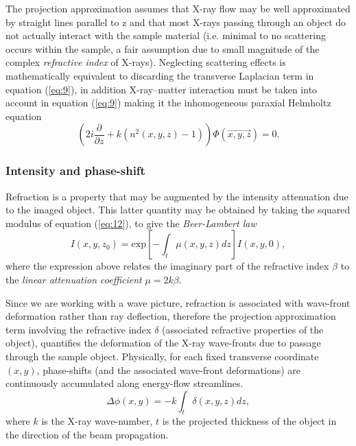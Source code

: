 \documentclass[9pt, a4paper]{article}
\begin{document}
The projection approximation assumes that X-ray flow may be well approximated by straight lines parallel to z\cite{PagsTutes} and that most X-rays passing through an object do not actually interact with the sample material (i.e. minimal to no scattering occurs within the sample, a fair assumption due to small magnitude of the complex \textit{refractive index} of X-rays). Neglecting scattering effects is mathematically equivalent to discarding the transverse Laplacian term in equation (\ref{eq:9})\cite{CH49}, in addition X-ray--matter interaction must be taken into account in equation (\ref{eq:9}) making it the inhomogeneous paraxial Helmholtz equation
\begin{equation}\label{eq:13}
\left ( 2 i \frac{\partial }{\partial z} + k ( n^2 (x, y, z) - 1 )\right ) \Phi(\vec{x , y, z}) = 0.
\end{equation}

\subsubsection{Intensity and phase-shift}
Refraction is a property that may be augmented by the intensity attenuation due to the imaged object. This latter quantity may be obtained by taking the squared
modulus of equation (\ref{eq:12}), to give the \textit{Beer-Lambert law}\cite{PagsTutes}
\begin{equation}\label{eq:14}
I(x, y, z_0) = \mathrm{exp}[-\int_{t} \mu(x, y, z) dz] I(x, y, 0),
\end{equation}
where the expression above relates the imaginary part of the refractive index $\beta$ to the \textit{linear attenuation coefficient} $\mu = 2k\beta$.

Since we are working with a wave picture, refraction is associated with wave-front deformation rather than ray deflection, therefore the projection approximation term involving the refractive index $\delta$ (associated refractive properties of the object), quantifies the deformation of the X-ray wave-fronts due to passage through the sample object. Physically, for each fixed transverse coordinate $(x, y)$, phase-shifts (and the associated wave-front deformations) are continuously accumulated along energy-flow streamlines\cite{PagsTutes}.
\begin{equation}\label{eq:15}
\Delta \phi(x, y) = -k \int_{t}\delta(x, y, z)dz,
\end{equation}
where $k$ is the X-ray wave-number, $t$ is the projected thickness of the object in the direction of the beam propagation.
\end{document}
